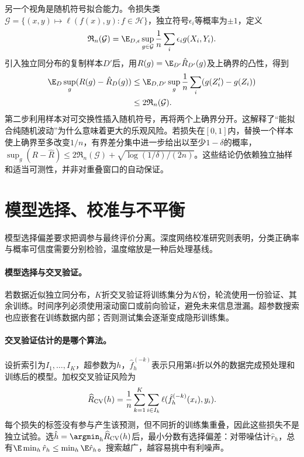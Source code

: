 另一个视角是随机符号拟合能力。令损失类$\mathcal G=\{(x,y)\mapsto\ell(f(x),y):f\in\mathcal H\}$，独立符号$\epsilon_i$等概率为$\pm1$，定义
\begin{equation}
 \mathfrak R_n(\mathcal G)=\E_{D,\epsilon}\sup_{g\in\mathcal G}
 \frac1n\sum_i\epsilon_i g(X_i,Y_i).
\end{equation}
引入独立同分布的复制样本$D'$后，用$R(g)=\E_{D'}\hat R_{D'}(g)$及上确界的凸性，得到
\begin{align}
 \E_D\sup_g(R(g)-\hat R_D(g))
 &\leq\E_{D,D'}\sup_g\frac1n\sum_i(g(Z_i')-g(Z_i))\\
 &\leq2\mathfrak R_n(\mathcal G).
\end{align}
第二步利用样本对可交换性插入随机符号，再将两个上确界分开。这解释了“能拟合纯随机波动”为什么意味着更大的乐观风险。若损失在$[0,1]$内，替换一个样本使上确界至多改变$1/n$，有界差分集中进一步给出以至少$1-\delta$的概率，$\sup_g(R-\hat R)\leq2\mathfrak R_n(\mathcal G)+\sqrt{\log(1/\delta)/(2n)}$。这些结论仍依赖独立抽样和适当可测性，并非对重叠窗口的自动保证。

\section{模型选择、校准与不平衡}
模型选择偏差要求把调参与最终评价分离\cite{cawley2010selection}。深度网络校准研究则表明，分类正确率与概率可信度需要分别检验，温度缩放是一种后处理基线\cite{guo2017calibration}。
\paragraph{模型选择与交叉验证。}
若数据近似独立同分布，$K$折交叉验证将训练集分为$K$份，轮流使用一份验证、其余训练。时间序列必须使用滚动窗口或前向验证，避免未来信息泄漏。超参数搜索也应嵌套在训练数据内部；否则测试集会逐渐变成隐形训练集。

\paragraph{交叉验证估计的是哪个算法。}
设折索引为$I_1,\ldots,I_K$，超参数为$h$，$\hat f_h^{(-k)}$表示只用第$k$折以外的数据完成预处理和训练后的模型。加权交叉验证风险为
\begin{equation}
 \widehat R_{\rm CV}(h)=\frac1n\sum_{k=1}^K\sum_{i\in I_k}
 \ell(\hat f_h^{(-k)}(x_i),y_i).
\end{equation}
每个损失的标签没有参与产生该预测，但不同折的训练集重叠，因此这些损失不是独立试验。选$\hat h=\argmin_h\widehat R_{\rm CV}(h)$后，最小分数有选择偏差：对带噪估计$\hat r_h$，总有$\E\min_h\hat r_h\leq\min_h\E\hat r_h$。搜索越广，越容易挑中有利噪声。

